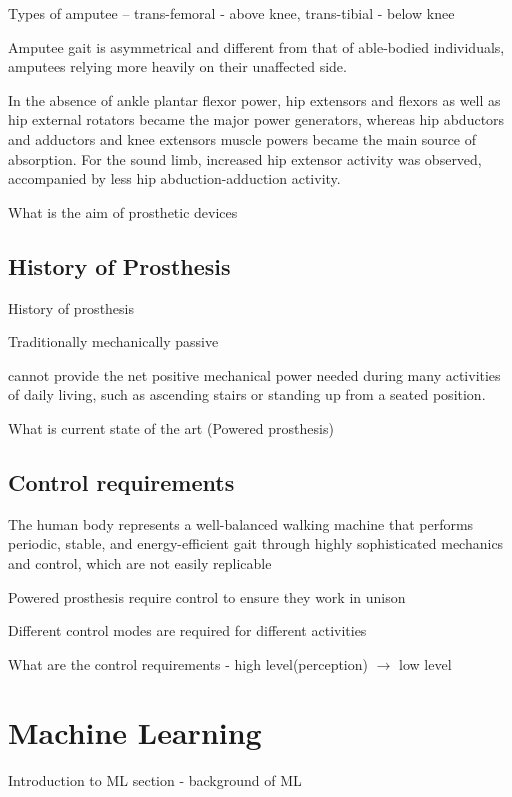 Types of amputee -- trans-femoral - above knee, trans-tibial - below knee

Amputee gait is asymmetrical and different from that of able-bodied individuals, amputees relying more heavily on their unaffected side.\cite{Bateni2002, Varrecchia2019}

In the absence of ankle plantar flexor power, hip extensors and flexors as well as hip external rotators became the major power generators, whereas hip abductors and adductors and knee extensors muscle powers became the main source of absorption. For the sound limb, increased hip extensor activity was observed, accompanied by less hip abduction-adduction activity.\cite{Sadeghi2001}



What is the aim of prosthetic devices

\subsection{History of Prosthesis}
History of prosthesis

Traditionally mechanically passive

cannot provide the net positive mechanical power needed during many activities of daily living, such as ascending stairs or standing up from a seated position\cite{Simon2013}.

What is current state of the art (Powered prosthesis)

\subsection{Control requirements} %
The human body represents a well-balanced walking machine that performs periodic, stable, and energy-efficient gait through highly sophisticated mechanics and control, which are not easily replicable\cite{Mummolo2013}

Powered prosthesis require control to ensure they work in unison

Different control modes are required for different activities\cite{Simon2013}

What are the control requirements - high level(perception) $\rightarrow$ low level\cite{Tucker2015}


\section{Machine Learning}
Introduction to ML section - background of ML

